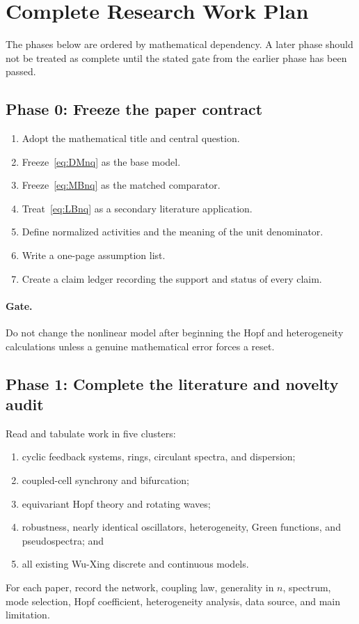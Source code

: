 \documentclass[11pt, reqno]{amsart}
\theoremstyle{definition}
\theoremstyle{remark}
\begin{document}
\section{Complete Research Work Plan}
\label{app:work-plan}

The phases below are ordered by mathematical dependency.  A later phase should
not be treated as complete until the stated gate from the earlier phase has
been passed.

\subsection{Phase 0: Freeze the paper contract}

\begin{enumerate}[label=0.\arabic*,leftmargin=3em]
    \item Adopt the mathematical title and central question.
    \item Freeze~\eqref{eq:DMnq} as the base model.
    \item Freeze~\eqref{eq:MBnq} as the matched comparator.
    \item Treat~\eqref{eq:LBnq} as a secondary literature application.
    \item Define normalized activities and the meaning of the unit denominator.
    \item Write a one-page assumption list.
    \item Create a claim ledger recording the support and status of every claim.
\end{enumerate}

\paragraph{Gate.}
Do not change the nonlinear model after beginning the Hopf and heterogeneity
calculations unless a genuine mathematical error forces a reset.

\subsection{Phase 1: Complete the literature and novelty audit}

Read and tabulate work in five clusters:
\begin{enumerate}[label=1.\arabic*,leftmargin=3em]
    \item cyclic feedback systems, rings, circulant spectra, and dispersion;
    \item coupled-cell synchrony and bifurcation;
    \item equivariant Hopf theory and rotating waves;
    \item robustness, nearly identical oscillators, heterogeneity, Green
    functions, and pseudospectra; and
    \item all existing Wu-Xing discrete and continuous models.
\end{enumerate}
For each paper, record the network, coupling law, generality in $n$, spectrum,
mode selection, Hopf coefficient, heterogeneity analysis, data source, and main
limitation.
\end{document}
